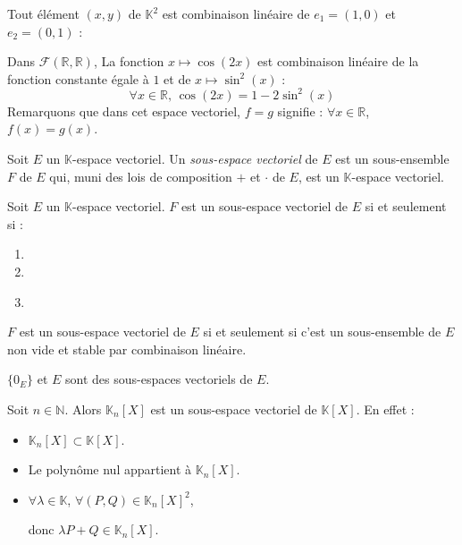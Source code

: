 \documentclass[a4paper,10pt]{report}
\begin{document}
\begin{exems}
\item Tout élément $(x,y)$ de $\mathbb{K}^2$ est combinaison linéaire de $e_1=(1,0)$ et $e_2=(0,1)$ :

\phantom{$(x,y) = x(1,0)+ y(0,1)= xe_1 + y e_2$}
\item Dans $\mathcal{F}(\mathbb{R},\mathbb{R})$, La fonction $x \mapsto \cos(2x)$ est combinaison linéaire de la fonction constante égale à $1$ et de $x \mapsto \sin^2(x)$ :
$$ \forall x \in \mathbb{R}, \, \cos(2x) = 1 - 2 \sin^2(x)$$
Remarquons que dans cet espace vectoriel, $f=g$ signifie : $\forall x \in \mathbb{R}$, $f(x)=g(x)$.
\end{exems}



\begin{defin} Soit $E$ un $\mathbb{K}$-espace vectoriel. Un \textit{sous-espace vectoriel} de $E$ est un sous-ensemble $F$ de $E$ qui, muni  des lois de composition $+$ et $\cdot$ de $E$, est un $\mathbb{K}$-espace vectoriel.
\end{defin}

\begin{prop}
Soit $E$ un $\mathbb{K}$-espace vectoriel. $F$ est un sous-espace vectoriel de $E$ si et seulement si :
\begin{enumerate}
\item \phantom{$F \subset E$.}
\item {}
\item {}

$\phantom{jj}$
\end{enumerate}
\end{prop}

\begin{rem}
$F$ est un sous-espace vectoriel de $E$ si et seulement si c'est un sous-ensemble de $E$ non vide et stable par combinaison linéaire.
\end{rem}

\begin{exems}
\item $\lbrace 0_E \rbrace$ et $E$ sont des sous-espaces vectoriels de $E$.
\item Soit $n \in \mathbb{N}$. Alors $\mathbb{K}_n[X]$ est un sous-espace vectoriel de $\mathbb{K}[X]$. En effet :
\begin{itemize}
\item $\mathbb{K}_n[X] \subset \mathbb{K}[X]$.
\item Le polynôme nul appartient à $\mathbb{K}_n[X]$.
\item $\forall \lambda \in \mathbb{K}$, $\forall (P,Q) \in \mathbb{K}_n[X]^2$,

\vspace{1cm}

donc $\lambda P + Q \in \mathbb{K}_n[X]$.
\end{itemize}
\end{exems}
\end{document}
